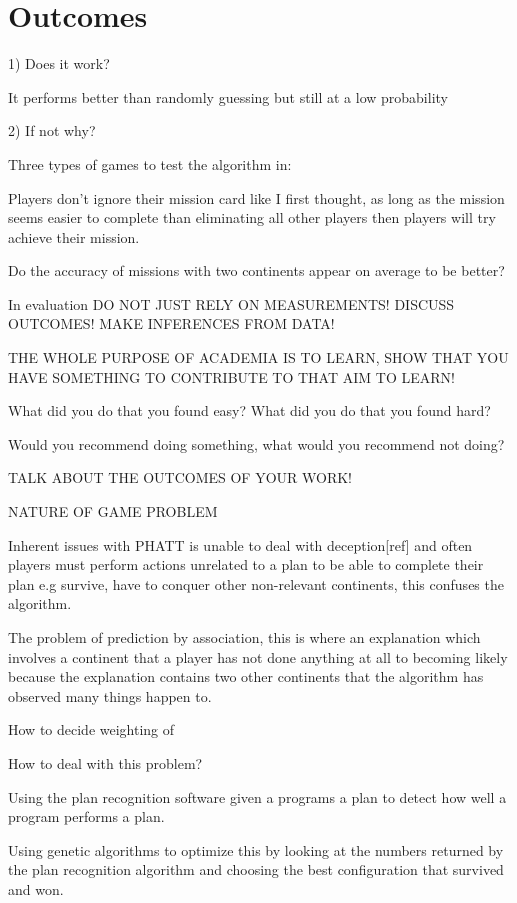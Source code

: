 \documentclass[parskip]{cs4rep}
\begin{document}
\section{Outcomes}

1) Does it work?

It performs better than randomly guessing but still at a low probability

2) If not why?

Three types of games to test the algorithm in:

Players don't ignore their mission card like I first thought, as long as the mission seems easier to complete than eliminating all other players then players will try achieve their mission.

Do the accuracy of missions with two continents appear on average to be better?

In evaluation DO NOT JUST RELY ON MEASUREMENTS! DISCUSS OUTCOMES! MAKE INFERENCES FROM DATA!

THE WHOLE PURPOSE OF ACADEMIA IS TO LEARN, SHOW THAT YOU HAVE SOMETHING TO CONTRIBUTE TO THAT AIM TO LEARN!

What did you do that you found easy? What did you do that you found hard? 

Would you recommend doing something, what would you recommend not doing?

TALK ABOUT THE OUTCOMES OF YOUR WORK!

NATURE OF GAME PROBLEM

Inherent issues with PHATT is unable to deal with deception[ref] and often players must perform actions unrelated to a plan to be able to complete their plan e.g survive, have to conquer other non-relevant continents, this confuses the algorithm.

The problem of prediction by association, this is where an explanation which involves a continent that a player has not done anything at all to becoming likely because the explanation contains two other continents that the algorithm has observed many things happen to.

How to decide weighting of 

How to deal with this problem?

Using the plan recognition software given a programs a plan to detect how well a program performs a plan. 

Using genetic algorithms to optimize this by looking at the numbers returned by the plan recognition algorithm and choosing the best configuration that survived and won.
\end{document}
